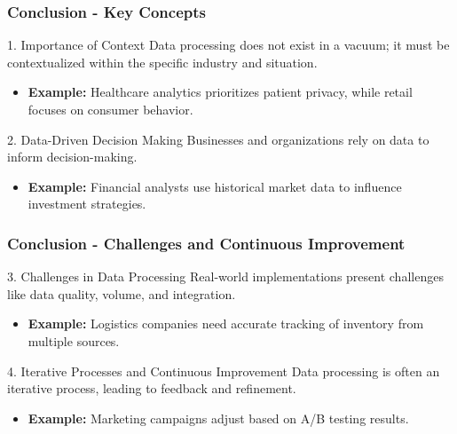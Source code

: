 \documentclass[aspectratio=169]{beamer}
\begin{document}
\begin{frame}[fragile]
    \frametitle{Conclusion - Key Concepts}
    \begin{block}{1. Importance of Context}
        Data processing does not exist in a vacuum; it must be contextualized within the specific industry and situation.
        \begin{itemize}
            \item \textbf{Example:} Healthcare analytics prioritizes patient privacy, while retail focuses on consumer behavior.
        \end{itemize}
    \end{block}

    \begin{block}{2. Data-Driven Decision Making}
        Businesses and organizations rely on data to inform decision-making.
        \begin{itemize}
            \item \textbf{Example:} Financial analysts use historical market data to influence investment strategies.
        \end{itemize}
    \end{block}
\end{frame}

\begin{frame}[fragile]
    \frametitle{Conclusion - Challenges and Continuous Improvement}
    \begin{block}{3. Challenges in Data Processing}
        Real-world implementations present challenges like data quality, volume, and integration.
        \begin{itemize}
            \item \textbf{Example:} Logistics companies need accurate tracking of inventory from multiple sources.
        \end{itemize}
    \end{block}

    \begin{block}{4. Iterative Processes and Continuous Improvement}
        Data processing is often an iterative process, leading to feedback and refinement.
        \begin{itemize}
            \item \textbf{Example:} Marketing campaigns adjust based on A/B testing results.
        \end{itemize}
    \end{block}
\end{frame}
\end{document}
